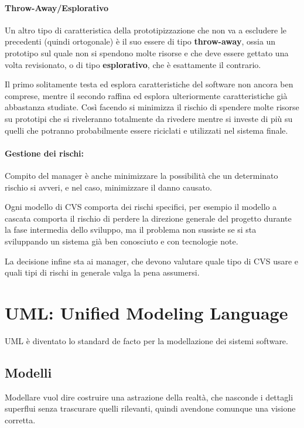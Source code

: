         \paragraph{Throw-Away/Esplorativo} Un altro tipo di caratteristica della prototipizzazione che non va a escludere le precedenti (quindi ortogonale) è il suo essere di tipo \textbf{throw-away}, ossia un prototipo sul quale non si spendono molte risorse e che deve essere gettato una volta revisionato, o di tipo \textbf{esplorativo}, che è esattamente il contrario.
        
        Il primo solitamente testa ed esplora caratteristiche del software non ancora ben comprese, mentre il secondo raffina ed esplora ulteriormente caratteristiche già abbastanza studiate. Così facendo si minimizza il rischio di spendere molte risorse su prototipi che si riveleranno totalmente da rivedere mentre si investe di più su quelli che potranno probabilmente essere riciclati e utilizzati nel sistema finale.
        
        \paragraph{Gestione dei rischi:} Compito del manager è anche minimizzare la possibilità che un determinato rischio si avveri, e nel caso, minimizzare il danno causato.
        
        Ogni modello di CVS comporta dei rischi specifici, per esempio il modello a cascata comporta il rischio di perdere la direzione generale del progetto durante la fase intermedia dello sviluppo, ma il problema non sussiste se si sta sviluppando un sistema già ben conosciuto e con tecnologie note.
        
        La decisione infine sta ai manager, che devono valutare quale tipo di CVS usare e quali tipi di rischi in generale valga la pena assumersi.
        
\section{UML: Unified Modeling Language}
    UML è diventato lo standard de facto per la modellazione dei sistemi software.
            
\subsection{Modelli}
    Modellare vuol dire costruire una astrazione della realtà, che nasconde i dettagli superflui senza trascurare quelli rilevanti, quindi avendone comunque una visione corretta.
    

